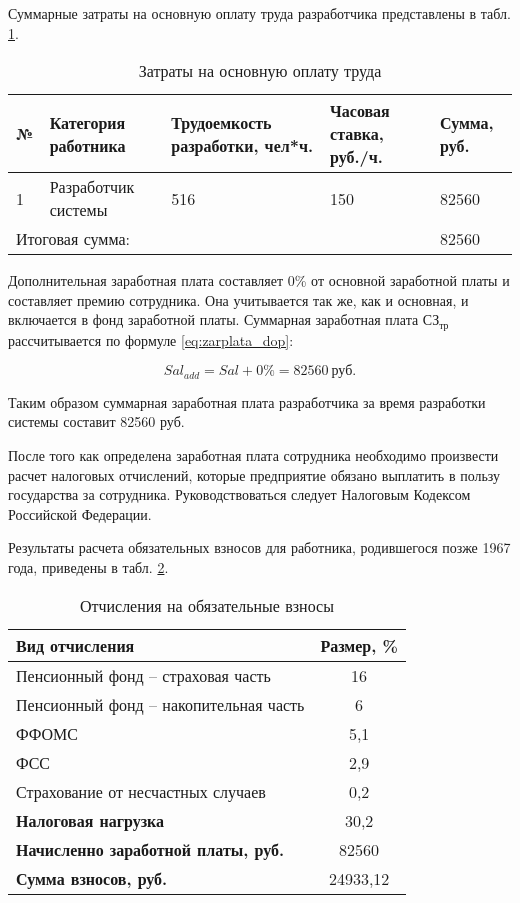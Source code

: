 Суммарные затраты на основную оплату труда разработчика представлены в табл. \ref{tab:zarplata}.

\begin{footnotesize}
\begin{longtable}[h]{|p{}|p{}|p{}|p{}|p{}|}
	\caption{\label{tab:zarplata}Затраты на основную оплату труда} \\
	\hline
		\textbf{№} &
		\textbf{Категория работника} &
		\textbf{Трудоемкость разработки, чел*ч.} &
		\textbf{Часовая ставка, руб./ч.} &
		\textbf{Сумма, руб.} \\
	\hline
		1 & Разработчик системы & 516 & 150 & 82560 \\ \hline
		\multicolumn{4}{|l|}{Итоговая сумма:} & 82560 \\ \hline
\end{longtable}
\end{footnotesize}

Дополнительная заработная плата составляет 0\% от основной заработной платы и составляет премию сотрудника.
Она учитывается так же, как и основная, и включается в фонд заработной платы.
Суммарная заработная плата $СЗ_{тр}$ рассчитывается по формуле \ref{eq:zarplata_dop}: 

\begin{equation}
	\label{eq:zarplata_dop}
	Sal_{add} = Sal + 0\% = 82560~\text{руб}.
\end{equation}

Таким образом суммарная заработная плата разработчика за время разработки системы составит 82560 руб. 

После того как определена заработная плата сотрудника необходимо произвести расчет налоговых отчислений, которые предприятие обязано выплатить в пользу государства за сотрудника.
Руководствоваться следует Налоговым Кодексом Российской Федерации.

Результаты расчета обязательных взносов для работника, родившегося позже 1967 года, приведены в табл. \ref{tab:zarplata_nalog}.

\begin{table}[h!]
\caption{\label{tab:zarplata_nalog}Отчисления на обязательные взносы}
\begin{footnotesize}
\begin{tabular}{|l|c|}
	\hline
	\textbf{Вид отчисления} & \textbf{Размер, \%} \\
	\hline 
	Пенсионный фонд -- страховая часть & 16 \\ 
	Пенсионный фонд -- накопительная часть & 6 \\
	ФФОМС & 5,1 \\ 
	ФСС & 2,9 \\ 
	Страхование от несчастных случаев & 0,2 \\
	\hline
	\textbf{Налоговая нагрузка} & 30,2 \\ \hline
	\textbf{Начисленно заработной платы, руб.} & 82560 \\ \hline
	\textbf{Сумма взносов, руб.} & 24933,12 \\ \hline
\end{tabular}
\end{footnotesize}
\end{table}


